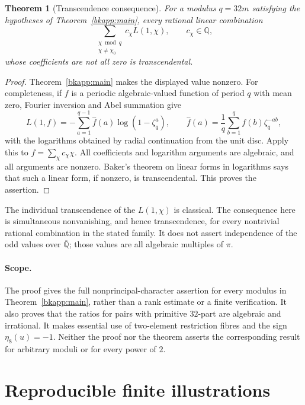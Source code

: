 \documentclass[11pt,a4paper]{article}
\newtheorem{theorem}{Theorem}[section]
\theoremstyle{definition}
\theoremstyle{remark}
\begin{document}
\begin{theorem}[Transcendence consequence]
\label{bkapp:transcendence}
For a modulus $q=32m$ satisfying the hypotheses of
Theorem~\ref{bkapp:main}, every rational linear combination
\[
 \sum_{\substack{\chi\bmod q\\\chi\ne\chi_0}}
   c_\chi L(1,\chi),
 \qquad c_\chi\in\mathbb Q,
\]
whose coefficients are not all zero is transcendental.
\end{theorem}

\begin{proof}
Theorem~\ref{bkapp:main} makes the displayed value nonzero.
For completeness, if $f$ is a periodic algebraic-valued function of
period $q$ with mean zero, Fourier inversion and Abel summation give
\[
 L(1,f)=-\sum_{a=1}^{q-1}\widehat f(a)\log(1-\zeta_q^a),
 \qquad
 \widehat f(a)=\frac1q\sum_{b=1}^q f(b)\zeta_q^{-ab},
\]
with the logarithms obtained by radial continuation from the unit
disc.  Apply this to $f=\sum_\chi c_\chi\chi$.
All coefficients and logarithm arguments are algebraic, and all
arguments are nonzero.  Baker's theorem on linear forms in
logarithms \cite{BK_Baker1975} says that such a linear form, if
nonzero, is transcendental.  This proves the assertion.
\end{proof}

The individual transcendence of the $L(1,\chi)$ is classical.
The consequence here is simultaneous nonvanishing, and hence
transcendence, for every nontrivial rational combination in the
stated family.  It does not assert independence of the odd values
over $\overline{\mathbb Q}$; those values are all algebraic
multiples of $\pi$.

\paragraph{Scope.}
The proof gives the full nonprincipal-character assertion for every
modulus in Theorem~\ref{bkapp:main}, rather than a rank estimate or a
finite verification.  It also proves that the ratios for pairs with primitive $32$-part are
algebraic and irrational.  It makes essential
use of two-element restriction fibres and the sign
$\eta_8(u)=-1$.  Neither the proof nor the theorem asserts the
corresponding result for arbitrary moduli or for every power of $2$.

\clearpage
\section{Reproducible finite illustrations}\label{app:checks}
\end{document}
